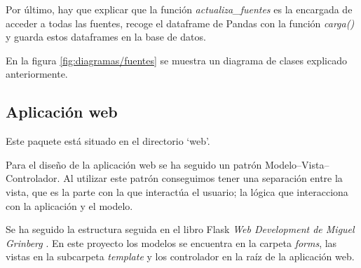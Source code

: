 Por último, hay que explicar que la función \textit{actualiza\_fuentes} es la encargada de acceder a todas las fuentes, recoge el dataframe de Pandas con la función \textit{carga()} y guarda estos dataframes en la base de datos.

En la figura \ref{fig:diagramas/fuentes} se muestra un diagrama de clases explicado anteriormente.


\subsection{Aplicación web}

Este paquete está situado en el directorio `web'.

Para el diseño de la aplicación web se ha seguido un patrón Modelo--Vista--Controlador. Al utilizar este patrón conseguimos tener una separación entre la vista, que es la parte con la que interactúa el usuario; la lógica que interacciona con la aplicación y el modelo.


Se ha seguido la estructura seguida en el libro Flask \textit{Web Development de Miguel Grinberg} \cite{book:flask}. En este proyecto los modelos se encuentra en la carpeta \textit{forms}, las vistas en la subcarpeta \textit{template} y los controlador en la raíz de la aplicación web.
